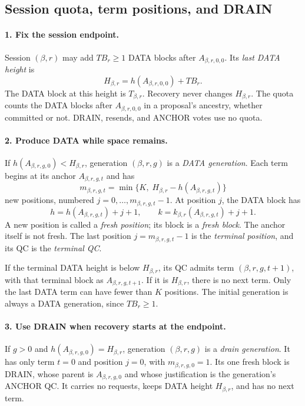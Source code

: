 \documentclass[11pt,a4paper]{article}
\newcommand{\TB}{\mathit{TB}}
\newcommand{\defterm}[1]{\textcolor{rrBlue}{\textit{#1}}}
\begin{document}
\subsection{Session quota, term positions, and DRAIN}
\label{sec:quota}
\paragraph{1. Fix the session endpoint.}
Session $(\beta,r)$ may add $\TB_r\ge1$ DATA blocks after $A_{\beta,r,0,0}$. Its \defterm{last
DATA height} is
\[
 H_{\beta,r}=h(A_{\beta,r,0,0})+\TB_r.
\]
The DATA block at this height is $T_{\beta,r}$. Recovery never changes $H_{\beta,r}$.
The quota counts the DATA blocks after $A_{\beta,r,0,0}$ in a proposal's
ancestry, whether committed or not. DRAIN, resends, and ANCHOR votes
use no quota.

\paragraph{2. Produce DATA while space remains.}
If $h(A_{\beta,r,g,0})<H_{\beta,r}$, generation $(\beta,r,g)$ is a \defterm{DATA generation}.
Each term begins at its anchor $A_{\beta,r,g,t}$ and has
\[
 m_{\beta,r,g,t}=\min\{K,\;H_{\beta,r}-h(A_{\beta,r,g,t})\}
\]
new positions, numbered $j=0,\ldots,m_{\beta,r,g,t}-1$. At position $j$, the
DATA block has
\[
 h=h(A_{\beta,r,g,t})+j+1,\qquad
 k=k_{\beta,r}(A_{\beta,r,g,t})+j+1.
\]
A new position is called a \defterm{fresh position}; its block is a
\defterm{fresh block}. The anchor itself is not fresh. The last position
$j=m_{\beta,r,g,t}-1$ is the \defterm{terminal position}, and its QC is the
\defterm{terminal QC}.

If the terminal DATA height is below $H_{\beta,r}$, its QC admits term
$(\beta,r,g,t+1)$, with that terminal block as $A_{\beta,r,g,t+1}$. If it is $H_{\beta,r}$,
there is no next term. Only the last DATA term can have fewer than $K$
positions. The initial generation is always a DATA generation, since
$\TB_r\ge1$.

\paragraph{3. Use DRAIN when recovery starts at the endpoint.}
If $g>0$ and $h(A_{\beta,r,g,0})=H_{\beta,r}$, generation $(\beta,r,g)$ is a
\defterm{drain generation}. It has only term $t=0$ and position $j=0$,
with $m_{\beta,r,g,0}=1$. Its one fresh block is DRAIN, whose parent is
$A_{\beta,r,g,0}$ and whose justification is the generation's ANCHOR QC.
It carries no requests, keeps DATA height $H_{\beta,r}$, and has no next term.
\end{document}
